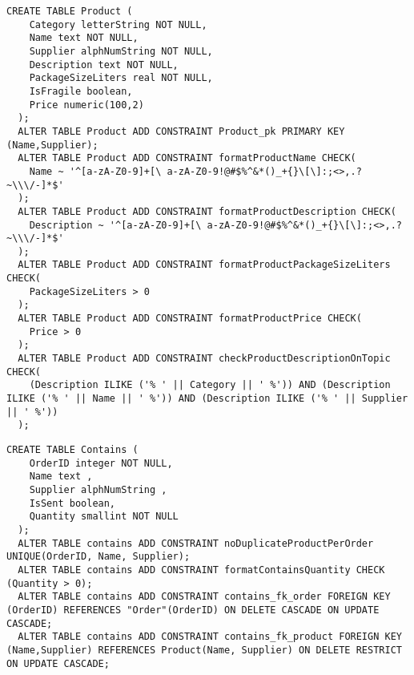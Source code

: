 \begin{lstlisting}[caption={Creazione della tabella \textbf{Product}}]
  CREATE TABLE Product (
    Category letterString NOT NULL,
    Name text NOT NULL,
    Supplier alphNumString NOT NULL,
    Description text NOT NULL,
    PackageSizeLiters real NOT NULL,
    IsFragile boolean,
    Price numeric(100,2)
  );
  ALTER TABLE Product ADD CONSTRAINT Product_pk PRIMARY KEY (Name,Supplier);
  ALTER TABLE Product ADD CONSTRAINT formatProductName CHECK(
    Name ~ '^[a-zA-Z0-9]+[\ a-zA-Z0-9!@#$%^&*()_+{}\[\]:;<>,.?~\\\/-]*$'
  );
  ALTER TABLE Product ADD CONSTRAINT formatProductDescription CHECK(
    Description ~ '^[a-zA-Z0-9]+[\ a-zA-Z0-9!@#$%^&*()_+{}\[\]:;<>,.?~\\\/-]*$'
  );
  ALTER TABLE Product ADD CONSTRAINT formatProductPackageSizeLiters CHECK(
    PackageSizeLiters > 0
  );
  ALTER TABLE Product ADD CONSTRAINT formatProductPrice CHECK(
    Price > 0
  );
  ALTER TABLE Product ADD CONSTRAINT checkProductDescriptionOnTopic CHECK(
    (Description ILIKE ('% ' || Category || ' %')) AND (Description ILIKE ('% ' || Name || ' %')) AND (Description ILIKE ('% ' || Supplier || ' %'))
  );
\end{lstlisting}

\newpage
\begin{lstlisting}[caption={Creazione della tabella \textbf{Contains}}]
  CREATE TABLE Contains (
    OrderID integer NOT NULL,
    Name text ,
    Supplier alphNumString ,
    IsSent boolean,
    Quantity smallint NOT NULL
  );
  ALTER TABLE contains ADD CONSTRAINT noDuplicateProductPerOrder UNIQUE(OrderID, Name, Supplier);
  ALTER TABLE contains ADD CONSTRAINT formatContainsQuantity CHECK (Quantity > 0);
  ALTER TABLE contains ADD CONSTRAINT contains_fk_order FOREIGN KEY (OrderID) REFERENCES "Order"(OrderID) ON DELETE CASCADE ON UPDATE CASCADE;
  ALTER TABLE contains ADD CONSTRAINT contains_fk_product FOREIGN KEY (Name,Supplier) REFERENCES Product(Name, Supplier) ON DELETE RESTRICT ON UPDATE CASCADE;
\end{lstlisting}

